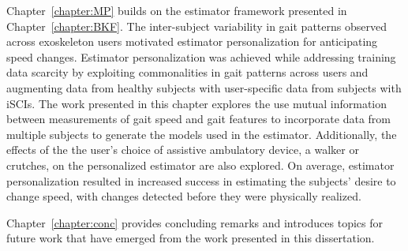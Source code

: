 Chapter~\ref{chapter:MP} builds on the estimator framework presented in Chapter~\ref{chapter:BKF}. The inter-subject variability in gait patterns observed across exoskeleton users motivated estimator personalization for anticipating speed changes. Estimator personalization was achieved while addressing training data scarcity by exploiting commonalities in gait patterns across users and augmenting data from healthy subjects with user-specific data from subjects with iSCIs. The work presented in this chapter explores the use mutual information between measurements of gait speed and gait features to incorporate data from multiple subjects to generate the models used in the estimator. Additionally, the effects of the the user's choice of assistive ambulatory device, a walker or crutches, on the personalized estimator are also explored. On average, estimator personalization resulted in increased success in estimating the subjects' desire to change speed, with changes detected before they were physically realized.

Chapter~\ref{chapter:conc} provides concluding remarks and introduces topics for future work that have emerged from the work presented in this dissertation.

